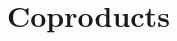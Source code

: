 \documentclass[hott-all.tex]{subfiles}
\begin{document}
\section{Coproducts}
\label{sec:compute-coprod}
%
%
%
%
\end{document}
